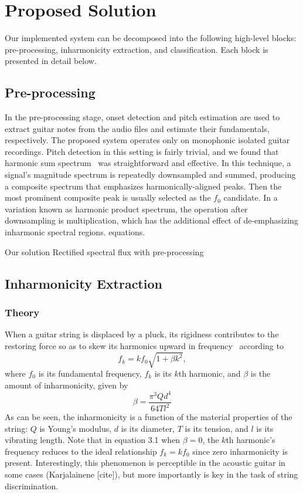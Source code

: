\documentclass[12pt]{cmuthesis}
\begin{document}
\singlespacing

\chapter{Proposed Solution}
\doublespacing
Our implemented system can be decomposed into the following high-level blocks: pre-processing, inharmonicity extraction, and classification. Each block is presented in detail below.

\section{Pre-processing}
In the pre-processing stage, onset detection and pitch estimation are used to extract guitar notes from the audio files and estimate their fundamentals, respectively. The proposed system operates only on monophonic isolated guitar recordings. Pitch detection in this setting is fairly trivial, and we found that harmonic sum spectrum~\cite{noll1969} was straightforward and effective. In this technique, a signal's magnitude spectrum is repeatedly downsampled and summed, producing a composite spectrum that emphasizes harmonically-aligned peaks. Then the most prominent composite peak is usually selected as the $f_0$ candidate. In a variation known as harmonic product spectrum, the operation after downsampling is multiplication, which has the additional effect of de-emphasizing inharmonic spectral regions. equations.

Our solution Rectified spectral flux with pre-processing~\cite{bello2005,dixon2006}

\section{Inharmonicity Extraction}
\subsection{Theory}
When a guitar string is displaced by a pluck, its rigidness contributes to the restoring force so as to skew its harmonics upward in frequency~\cite{fletcher1998} according to
\begin{equation}
f_{k} = kf_{0}\sqrt{1+\beta k^{2}},
\end{equation} 
where $f_0$ is its fundamental frequency, $f_k$ is its $k$th harmonic, and $\beta$ is the amount of inharmonicity, given by
\begin{equation}
\beta = \frac{\pi^{3}Qd^{4}}{64Tl^{2}}
\end{equation}
As can be seen, the inharmonicity is a function of the material properties of the string: $Q$ is Young's modulus, $d$ is its diameter, $T$ is its tension, and $l$ is its vibrating length. Note that in equation 3.1 when $\beta = 0$, the $k$th harmonic's frequency reduces to the ideal relationship $f_{k} = kf_{0}$ since zero inharmonicity is present. Interestingly, this phenomenon is perceptible in the acoustic guitar in some cases (Karjalainene [cite]), but more importantly is key in the task of string discrimination. 
\end{document}
